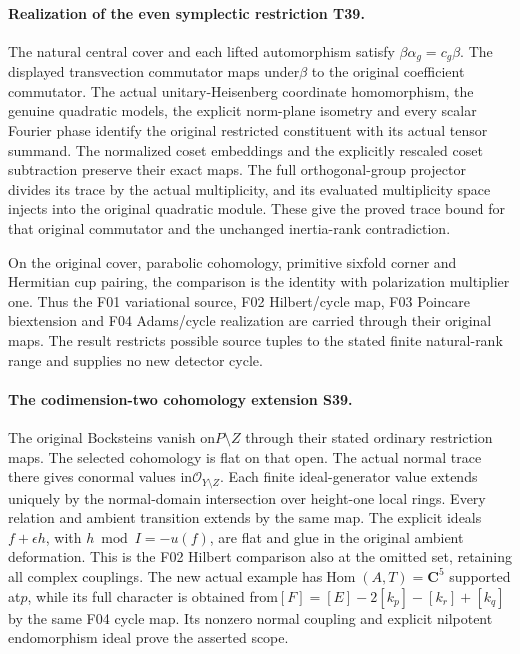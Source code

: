 \paragraph{Realization of the even symplectic restriction T39.}
The natural central cover and each lifted automorphism satisfy
$\beta\alpha_g=c_g\beta$. The displayed transvection
commutator maps under$\beta$ to the original coefficient
commutator. The actual unitary-Heisenberg coordinate
homomorphism, the genuine quadratic models, the explicit
norm-plane isometry and every scalar Fourier phase identify
the original restricted constituent with its actual tensor
summand. The normalized coset embeddings and the explicitly
rescaled coset subtraction preserve their exact maps.
The full orthogonal-group projector divides its trace by
the actual multiplicity, and its evaluated multiplicity
space injects into the original quadratic module.
These give the proved trace bound for that original
commutator and the unchanged inertia-rank contradiction.

On the original cover, parabolic cohomology, primitive
sixfold corner and Hermitian cup pairing, the comparison
is the identity with polarization multiplier one.
Thus the F01 variational source, F02 Hilbert/cycle map,
F03 Poincare biextension and F04 Adams/cycle realization
are carried through their original maps. The result
restricts possible source tuples to the stated finite
natural-rank range and supplies no new detector cycle.


\paragraph{The codimension-two cohomology extension S39.}
The original Bocksteins vanish on$P\setminus Z$ through
their stated ordinary restriction maps. The selected
cohomology is flat on that open. The actual normal trace
there gives conormal values in$\mathcal O_{Y\setminus Z}$.
Each finite ideal-generator value extends uniquely by
the normal-domain intersection over height-one local rings.
Every relation and ambient transition extends by the same
map. The explicit ideals$f+\epsilon h$, with
$h\bmod I=-u(f)$, are flat and glue in the original
ambient deformation. This is the F02 Hilbert comparison
also at the omitted set, retaining all complex couplings.
The new actual example has$\operatorname{Hom}(A,T)=\mathbf C^5$
supported at$p$, while its full character is obtained
from$[F]=[E]-2[k_p]-[k_r]+[k_q]$ by the same F04
cycle map. Its nonzero normal coupling and explicit
nilpotent endomorphism ideal prove the asserted scope.


